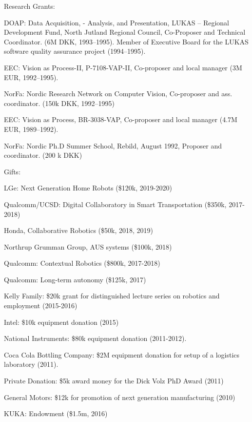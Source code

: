 \documentclass{article}
\begin{document}
\begin{cv}
\begin{cvlist}{Research Grants:}
\item DOAP: Data Acquisition, - Analysis, and Presentation, LUKAS --
  Regional Development Fund, North Jutland Regional Council,
  Co-Proposer and Technical Coordinator. (6M DKK, 1993--1995). Member
  of  Executive Board for the LUKAS software quality assurance project
  (1994--1995).%
\item EEC: Vision as Process-II, P-7108-VAP-II, Co-proposer and local
  manager (3M EUR, 1992--1995).%
\item NorFa: Nordic Research Network on Computer Vision, Co-proposer
  and ass. coordinator.  (150k DKK, 1992--1995)%
\item EEC: Vision as Process, BR-3038-VAP, Co-proposer and local
  manager (4.7M EUR, 1989--1992).%
\item NorFa: Nordic Ph.D Summer School, Rebild, August 1992, Proposer
  and coordinator. (200 k DKK)%
\end{cvlist}

\begin{cvlist}{Gifts:}
\item LGe: Next Generation Home Robots (\$120k, 2019-2020)
\item Qualcomm/UCSD: Digital Collaboratory in Smart Transportation
  (\$350k, 2017-2018)
\item Honda, Collaborative Robotics (\$50k, 2018, 2019)
\item Northrup Grumman Group, AUS systems (\$100k, 2018)
\item Qualcomm: Contextual Robotics (\$800k, 2017-2018)
\item Qualcomm: Long-term autonomy (\$125k, 2017)
\item Kelly Family: \$20k grant for distinguished lecture series on
  robotics and employment (2015-2016)
\item Intel: \$10k equipment donation (2015)
\item National Instruments: \$80k equipment donation (2011-2012).
\item Coca Cola Bottling Company: \$2M equipment donation for setup of
  a logistics laboratory (2011).
\item Private Donation: \$5k award money for the Dick Volz PhD Award
  (2011)
\item General Motors: \$12k for promotion of next generation
  manufacturing (2010)
\item KUKA: Endowment (\$1.5m, 2016)
\end{cvlist}


\end{cv}
\end{document}
